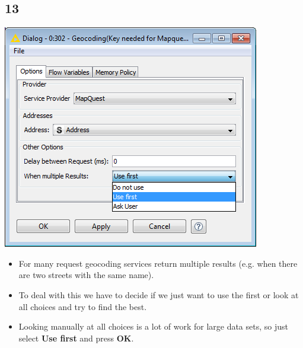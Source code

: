 \documentclass{beamer}
\begin{document}
\subsection{13}
\begin{frame}
	\begin{center}
  		\includegraphics[height=0.5\textheight]{13.png}
	\end{center}
	\begin{itemize}
		\item For many request geocoding services return multiple results (e.g. when there are two streets with the same name).
		\item To deal with this we have to decide if we just want to use the first or look at all choices and try to find the best.
		\item Looking manually at all choices is a lot of work for large data sets, so just select \textbf{Use first} and press \textbf{OK}.
	\end{itemize}
\end{frame}
\end{document}
